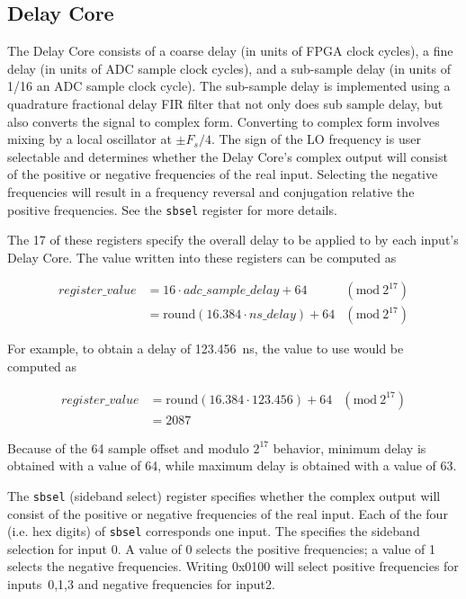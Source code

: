 \documentclass[12pt]{article}
\begin{document}
  \subsection{Delay Core}

The Delay Core consists of a coarse delay (in units of FPGA clock cycles), a
fine delay (in units of ADC sample clock cycles), and a sub-sample delay (in
units of 1/16 an ADC sample clock cycle).  The sub-sample delay is implemented
using a quadrature fractional delay FIR filter that not only does sub sample
delay, but also converts the signal to complex form.  Converting to complex
form involves mixing by a local oscillator at $\pm F_s/4$.  The sign of the LO
frequency is user selectable and determines whether the Delay Core's complex
output will consist of the positive or negative frequencies of the real input.
Selecting the negative frequencies will result in a frequency reversal and
conjugation relative the positive frequencies.  See the \verb|sbsel| register
for more details.

\begin{description}

\filbreak
{}
 The 17 \LSbs of these registers specify the overall delay to be
applied to by each input's Delay Core.  The value written into these registers
can be computed as

\begin{align*}
register\_value &= 16 \cdot adc\_sample\_delay + 64 &(\mathrm{mod}\:2^{17}) \\
                &= \mathrm{round}(16.384 \cdot ns\_delay) + 64 &(\mathrm{mod}\:2^{17})
\end{align*}

For example, to obtain a delay of 123.456~ns, the value to use would be
computed as

\begin{align*}
register\_value &= \mathrm{round}(16.384 \cdot 123.456) + 64 &(\mathrm{mod}\:2^{17}) \\
                &= 2087
\end{align*}

Because of the 64 sample offset and modulo $2^{17}$ behavior, minimum delay is
obtained with a value of 64, while maximum delay is obtained with a value of
63.

 The \verb|sbsel| (sideband select) register specifies whether the
complex output will consist of the positive or negative frequencies of the real
input.  Each of the four \LSns (i.e. hex digits) of \verb|sbsel| corresponds
one input.  The \LSn specifies the sideband selection for input 0.  A value of
0 selects the positive frequencies; a value of 1 selects the negative
frequencies.  Writing 0x0100 will select positive frequencies for inputs~0,1,3
and negative frequencies for input2.

\end{description}
\end{document}
